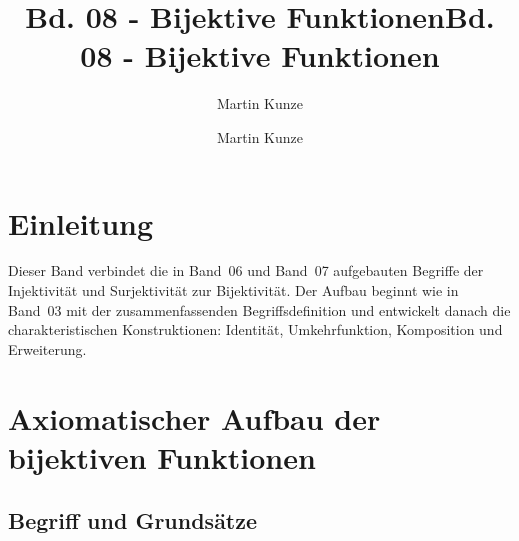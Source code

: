 \documentclass[main.tex]{subfiles}
\title{Bd. 08 - Bijektive Funktionen}
\author{Martin Kunze}
\date{}
\begin{document}
\title{Bd. 08 - Bijektive Funktionen}
\author{Martin Kunze}
\date{}
\hypersetup{pageanchor=false}
\maketitle
\hypersetup{pageanchor=true}
\setcounter{tocdepth}{3}
\tableofcontents
\setcounter{file}{8}
\renewcommand{\FormulaBandID}{8}

\chapter{Einleitung}

Dieser Band verbindet die in Band~06 und Band~07 aufgebauten Begriffe der
Injektivität und Surjektivität zur Bijektivität. Der Aufbau beginnt wie in
Band~03 mit der zusammenfassenden Begriffsdefinition und entwickelt danach
die charakteristischen Konstruktionen: Identität, Umkehrfunktion,
Komposition und Erweiterung.

\chapter{Axiomatischer Aufbau der bijektiven Funktionen}

\section{Begriff und Grundsätze}


\begin{tabproof}
\end{tabproof}
\end{document}
